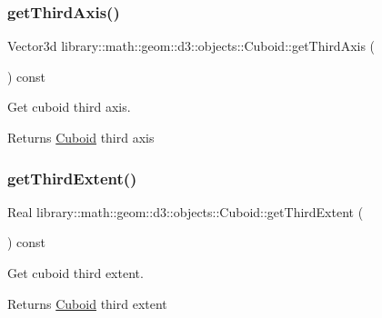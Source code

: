 \subsubsection{\texorpdfstring{get\+Third\+Axis()}{getThirdAxis()}}
{\footnotesize\ttfamily Vector3d library\+::math\+::geom\+::d3\+::objects\+::\+Cuboid\+::get\+Third\+Axis (\begin{DoxyParamCaption}{ }\end{DoxyParamCaption}) const}



Get cuboid third axis. 

\begin{DoxyReturn}{Returns}
\hyperlink{classlibrary_1_1math_1_1geom_1_1d3_1_1objects_1_1_cuboid}{Cuboid} third axis 
\end{DoxyReturn}
\mbox{\label{classlibrary_1_1math_1_1geom_1_1d3_1_1objects_1_1_cuboid_a1b1541558cfac6d90e0fd4d3c4dd7d96}} 
\subsubsection{\texorpdfstring{get\+Third\+Extent()}{getThirdExtent()}}
{\footnotesize\ttfamily Real library\+::math\+::geom\+::d3\+::objects\+::\+Cuboid\+::get\+Third\+Extent (\begin{DoxyParamCaption}{ }\end{DoxyParamCaption}) const}



Get cuboid third extent. 

\begin{DoxyReturn}{Returns}
\hyperlink{classlibrary_1_1math_1_1geom_1_1d3_1_1objects_1_1_cuboid}{Cuboid} third extent 
\end{DoxyReturn}
\mbox{\label{classlibrary_1_1math_1_1geom_1_1d3_1_1objects_1_1_cuboid_adba483e8727feeaa99c3e4135831ce86}} 

